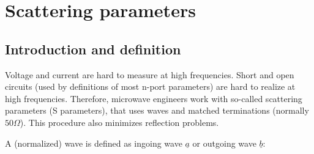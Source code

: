 %
%
%
%

\chapter{Scattering parameters}

\section{Introduction and definition}

Voltage and current are hard to measure at high frequencies.  Short
and open circuits (used by definitions of most n-port parameters) are
hard to realize at high frequencies.  Therefore, microwave engineers
work with so-called scattering parameters (S parameters), that uses
waves and matched terminations (normally $50 \Omega$).  This procedure
also minimizes reflection problems.

\addvspace{12pt}

A (normalized) wave is defined as ingoing wave $\underline{a}$ or
outgoing wave $\underline{b}$:

